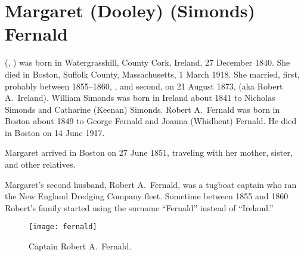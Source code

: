 \section{Margaret (Dooley) (Simonds) Fernald}\label{per:Margaret3Dooley}

 (, ) was born in Watergrasshill, County Cork, Ireland, 27 December 1840.\cite{Margaret3DooleyBaptism:2} She died in Boston, Suffolk County, Massachusetts, 1 March 1918.\cite{Margaret3DooleyDeath} She married, first, probably between 1855--1860, ,\cite{WilliamSimondsMarriage} and second, on 21 August 1873, \cite{RobertFernaldMarriage:2} (aka Robert A.\ Ireland).\cite{Census1855RobertFernald:1} William Simonds was born in Ireland about 1841\cite{Census1855WilliamSimonds} to Nicholas Simonds and Catharine (Keenan) Simonds.\cite{WilliamSimondsDeath,CatharineSimondsDeath} Robert A.\ Fernald was born in Boston about 1849 to George Fernald and Joanna (Whidhent) Fernald.\cite{RobertFernaldMarriage:3,JoannaFernaldDeath} He died in Boston on 14 June 1917.\cite{RobertFernaldDeath:1}

Margaret arrived in Boston on 27 June 1851, traveling with her mother, sister, and other relatives.\cite{Chascay:9}

Margaret's second husband, Robert A.\ Fernald, was a tugboat captain who ran the New England Dredging Company fleet.\cite{RobertFernaldDeath:2} Sometime between 1855 and 1860 Robert's family started using the surname ``Fernald'' instead of ``Ireland.''\cite{Census1855RobertFernald:2,Census1860RobertFernald}

\begin{figure}
	\centering
	\texttt{[image: fernald]}
	\caption{Captain Robert A.\ Fernald.}
	\label{fig:RobertFernald}
\end{figure}

